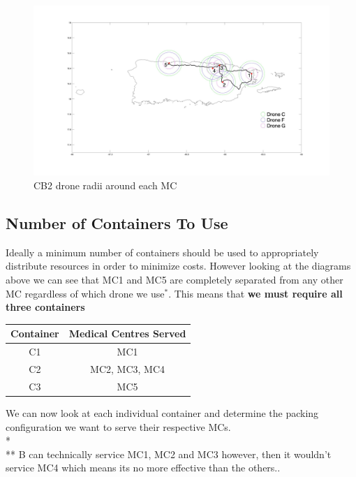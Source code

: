 \documentclass[a4paper,12pt]{article}
\begin{document}
\begin{figure}[p]
\centering
\includegraphics[scale =0.15]{CB2}
\caption{CB2 drone radii around each MC}
\label{cb2}
\end{figure}

\newpage

\subsection{Number of Containers To Use}
Ideally a minimum number of containers should be used to appropriately distribute resources in order to minimize costs.
However looking at the diagrams above we can see that MC1 and MC5 are completely separated from any other MC regardless
of which drone we use$^{*}$. This means that \bf{we must require all three containers} 

\begin{center}
\begin{tabular}{ |c|c| }
 \hline
 Container & Medical Centres Served \\\hline
  C1 & MC1 \\
  C2 & MC2, MC3, MC4  \\
  C3 & MC5 \\
 \hline
\end{tabular}
\end{center}

We can now look at each individual container and determine the packing configuration we want to serve their respective MCs.\\*
\\**
\footnotesize{B can technically service MC1, MC2 and MC3 however, then it wouldn't service MC4 which means its no more effective than the others.}\normalsize{.}
\end{document}
